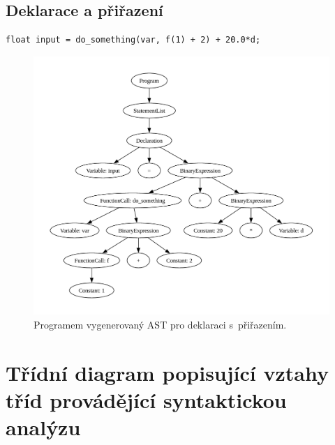 \section{Deklarace a přiřazení}

\begin{lstlisting}[language=Koubp]
    float input = do_something(var, f(1) + 2) + 20.0*d;
\end{lstlisting}
\begin{figure}[h]
    \centering
    \includegraphics[width=\textwidth]{obrazky-figures/tree_deklarace.pdf}
    \caption{Programem vygenerovaný AST pro deklaraci s~přiřazením.}
    \label{fig_ast_declaration}
\end{figure}


\chapter{Třídní diagram popisující vztahy tříd provádějící syntaktickou analýzu}\label{kap_priloha_b}

